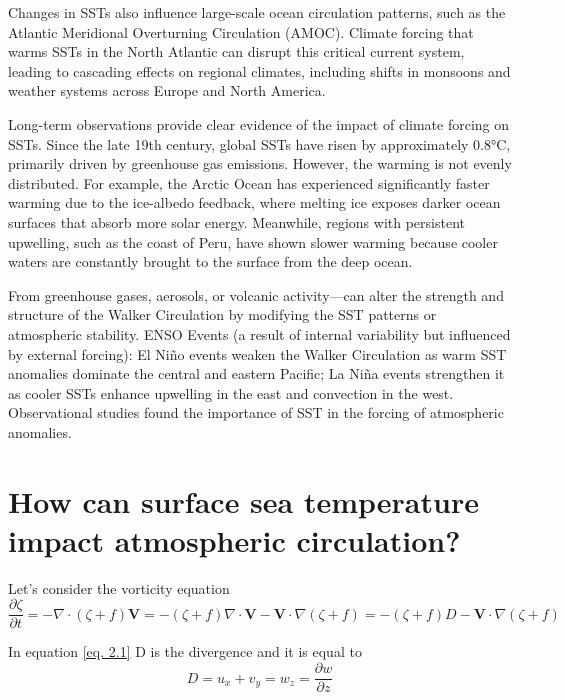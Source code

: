 Changes in SSTs also influence large-scale ocean circulation patterns, such as the Atlantic Meridional Overturning Circulation (AMOC). Climate forcing that warms SSTs in the North Atlantic can disrupt this critical current system, leading to cascading effects on regional climates, including shifts in monsoons and weather systems across Europe and North America.

Long-term observations provide clear evidence of the impact of climate forcing on SSTs. Since the late 19th century, global SSTs have risen by approximately 0.8°C, primarily driven by greenhouse gas emissions. However, the warming is not evenly distributed. For example, the Arctic Ocean has experienced significantly faster warming due to the ice-albedo feedback, where melting ice exposes darker ocean surfaces that absorb more solar energy. Meanwhile, regions with persistent upwelling, such as the coast of Peru, have shown slower warming because cooler waters are constantly brought to the surface from the deep ocean.


From greenhouse gases, aerosols, or volcanic activity—can alter the strength and structure of the Walker Circulation by modifying the SST patterns or atmospheric stability.
ENSO Events (a result of internal variability but influenced by external forcing): El Niño events weaken the Walker Circulation as warm SST anomalies dominate the central and eastern Pacific; La Niña events strengthen it as cooler SSTs enhance upwelling in the east and convection in the west.
Observational studies found the importance of SST in the forcing of atmospheric anomalies.


\section{How can surface sea temperature impact atmospheric circulation?}

Let's consider the vorticity equation
\begin{equation}\label{eq. 2.1}
	\frac{\partial \zeta}{\partial t} = - \nabla \cdot (\zeta + f) \mathbf{V} = - (\zeta + f) \nabla \cdot \mathbf{V} - \mathbf{V} \cdot \nabla (\zeta + f) = - (\zeta + f) D - \mathbf{V} \cdot \nabla (\zeta + f)
\end{equation}

In equation \ref{eq. 2.1} D is the divergence and it is equal to
\begin{equation}
	D=u_x + v_y = w_z = \frac{\partial w}{\partial z}
\end{equation}

